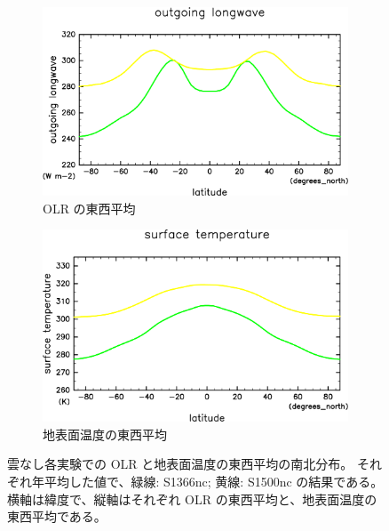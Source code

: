 \documentclass[body]{subfiles}
\begin{document}
\begin{figure}[t]
	\centering
	\begin{subfigure}{.45\textwidth}
		\centering
		\includegraphics[width=\textwidth]{OLR-overplot-nc-crop-rotate.pdf}
		\caption{OLR の東西平均}\label{OLR東西平均nc}
	\end{subfigure}
	\hfill
	\begin{subfigure}{.45\textwidth}
		\centering
		\includegraphics[width=\textwidth]{SurfTemp-overplot-nc-crop-rotate.pdf}
		\caption{地表面温度の東西平均}\label{地表面温度nc}
	\end{subfigure}
	\caption[雲なし各実験での OLR と地表面温度の東西平均]{
		雲なし各実験での OLR と地表面温度の東西平均の南北分布。
		それぞれ年平均した値で、緑線: S1366nc; 黄線: S1500nc の結果である。
		横軸は緯度で、縦軸はそれぞれ OLR の東西平均と、地表面温度の東西平均である。
	}
\end{figure}

\afterpage{\clearpage}
\end{document}
